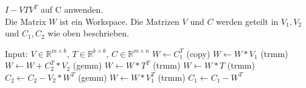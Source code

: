 \begin{algorithm}[H]
	\caption{$I - V T V^T$ auf C anwenden.\\
			 Die Matrix $W$ ist ein Workspace. Die Matrizen $V$ und $C$ werden geteilt in $V_1, V_2$ und $C_1,C_2$ wie oben beschrieben.}
	\label{alg:applyblockref}
	\begin{algorithmic}[1]
		\State Input: $V \in \mathbb{R}^{m \times k}$, $T \in \mathbb{R}^{k \times k}$, $C \in \mathbb{R}^{m \times n}$
		\State 	$W \leftarrow C_1^T$ (copy) \label{alg4:beg}
		\State	$W \leftarrow W * V_1 $ (trmm)
			\State $W \leftarrow W + C_2^T*V_2$ (gemm)
		\EndIf \label{alg4:end}
		 \label{alg4:trans}
			\State 	$ W \leftarrow W * T^T$ (trmm)
		\Else
			\State 	$  W \leftarrow W * T$ (trmm)
		\EndIf \label{alg4:transE}
			\State $C_2 \leftarrow C_2 - V_2 * W^T$ (gemm) \label{alg4:C2}
		\EndIf
		\State 	$ W \leftarrow W * V_1^T $ (trmm) \label{alg4:C1}
		\State 	$ C_1 \leftarrow C_1 - W^T $ \label{alg4:C12}
	\end{algorithmic}
\end{algorithm}


